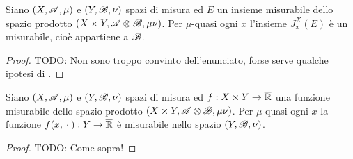 
\begin{proposition}
	Siano $(X,\mathscr A,\mu)$ e $(Y,\mathscr B,\nu)$ spazi di misura ed $E$ un insieme misurabile dello spazio prodotto $(X\times Y,\mathscr A\otimes\mathscr B,\mu\nu)$.
	Per $\mu$-quasi ogni $x$ l'insieme $J^X_x(E)$ è un misurabile, cioè appartiene a $\mathscr B$.
\end{proposition}
\begin{proof}
	TODO: Non sono troppo convinto dell'enunciato, forse serve qualche ipotesi di \sigfin[ezza].
\end{proof}

\begin{proposition}
	Siano $(X,\mathscr A,\mu)$ e $(Y,\mathscr B,\nu)$ spazi di misura ed $f:X\times Y\to\overline{\mathbb R}$ una funzione misurabile dello spazio prodotto $(X\times Y,\mathscr A\otimes\mathscr B,\mu\nu)$.
	Per $\mu$-quasi ogni $x$ la funzione $f(x,{}\cdot{}):Y\to\overline{\mathbb R}$ è misurabile nello spazio $(Y,\mathscr B,\nu)$.
\end{proposition}
\begin{proof}
	TODO: Come sopra!
\end{proof}





